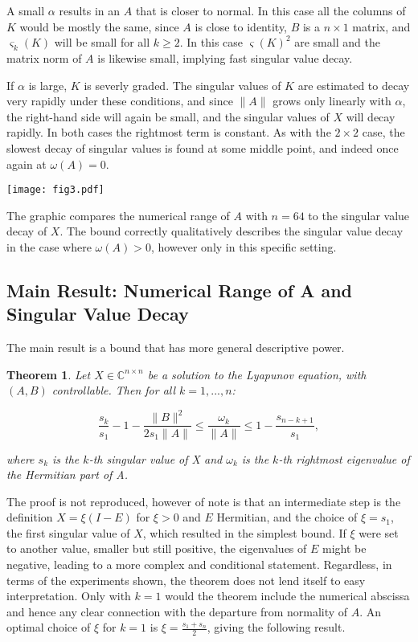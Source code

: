 \documentclass[12pt]{scrartcl}
\newcommand{\Cnn}{\mathbb{C}^{n \times n}}
\newtheorem*{nonthm}{Theorem}
\begin{document}
A small $\alpha$ results in an $A$ that is closer to normal. In this case all the columns of $K$ would be mostly the same, since $A$ is close to identity, $B$ is a $n \times 1$ matrix, and $\varsigma_{k}(K)$ will be small for all $k \geq 2$. In this case $\varsigma(K)^{2}$ are small and the matrix norm of $A$ is likewise small, implying fast singular value decay. 

If $\alpha$ is large, $K$ is severly graded. The singular values of $K$ are estimated to decay very rapidly under these conditions, and since $\|A\|$ grows only linearly with $\alpha$, the right-hand side will again be small, and the singular values of $X$ will decay rapidly. In both cases the rightmost term is constant. As with the $2 \times 2$ case, the slowest decay of singular values is found at some middle point, and indeed once again at $\omega(A)=0$.

\begin{center}
\texttt{[image: fig3.pdf]} \linebreak
\end{center}


The graphic compares the numerical range of $A$ with $n=64$ to the singular value decay of $X$. The bound correctly qualitatively describes the singular value decay in the case where $\omega(A)>0$, however only in this specific setting. 


\subsection{Main Result: Numerical Range of A and Singular Value Decay}

The main result is a bound that has more general descriptive power. 

\begin{nonthm}

Let $X \in \Cnn$ be a solution to the Lyapunov equation, with $(A,B)$ controllable. Then for all $k=1,...,n$:

$$\frac{s_{k}}{s_{1}}-1-\frac{\|B\|^{2}}{2s_{1}\|A\|} \leq \frac{\omega_{k}}{\|A\|} \leq 1- \frac{s_{n-k+1}}{s_{1}},$$

where $s_{k}$ is the $k$-th singular value of X and $\omega_{k}$ is the $k$-th rightmost eigenvalue of the Hermitian part of A. 

\end{nonthm}

The proof is not reproduced, however of note is that an intermediate step is the definition $X=\xi (I-E)$ for $\xi>0$ and $E$ Hermitian, and the choice of $\xi=s_{1}$, the first singular value of $X$, which resulted in the simplest bound. If $\xi$ were set to another value, smaller but still positive, the eigenvalues of $E$ might be negative, leading to a more complex and conditional statement. Regardless, in terms of the experiments shown, the theorem does not lend itself to easy interpretation. Only with $k=1$ would the theorem include the numerical abscissa and hence any clear connection with the departure from normality of $A$. An optimal choice of $\xi$ for $k=1$ is $\xi=\frac{s_{1}+s_{n}}{2}$, giving the following result. 
\end{document}
